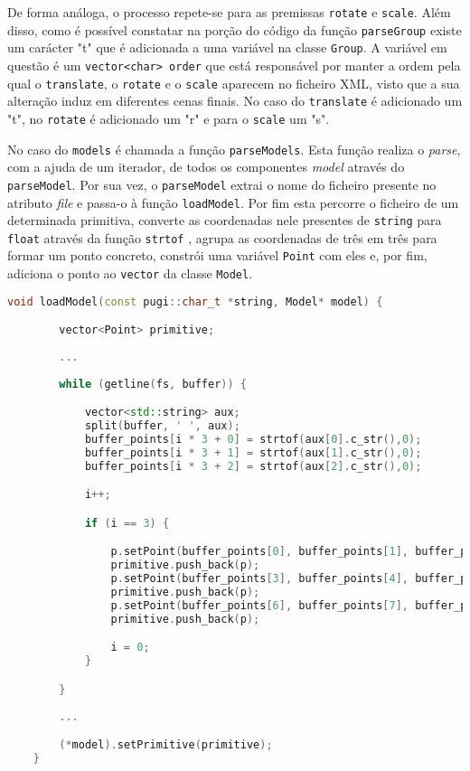 \documentclass[a4paper]{article}
\begin{document}
De forma análoga, o processo repete-se para as premissas \texttt{rotate} e \texttt{scale}. Além disso, como é possível constatar na porção do código da função \texttt{parseGroup} existe um carácter "t" que é adicionada a uma variável na classe \texttt{Group}. A variável em questão é um \texttt{vector<char> order} que está responsável por manter a ordem pela qual o \texttt{translate}, o \texttt{rotate} e o \texttt{scale} aparecem no ficheiro XML, visto que a sua alteração induz em diferentes cenas finais. No caso do \texttt{translate} é adicionado um "t", no \texttt{rotate} é adicionado um "r" e para o \texttt{scale} um "s".

No caso do \texttt{models} é chamada a função \texttt{parseModels}. Esta função realiza o \textit{parse}, com a ajuda de um iterador, de todos os componentes \textit{model} através do \texttt{parseModel}. Por sua vez, o \texttt{parseModel} extrai o nome do ficheiro presente no atributo \textit{file} e passa-o à função \texttt{loadModel}. Por fim esta percorre o ficheiro de um determinada primitiva, converte as coordenadas nele presentes de \texttt{string} para \texttt{float} através da função \texttt{strtof} \cite{strtof}, agrupa as coordenadas de três em três para formar um ponto concreto, constrói uma variável \texttt{Point} com eles e, por fim, adiciona o ponto ao \texttt{vector} da classe \texttt{Model}.

\begin{lstlisting}[language=C++, caption=\textit{Parse} do nodo \texttt{models} e consequente carregamento para a estrutura de dados.]
    void loadModel(const pugi::char_t *string, Model* model) {

        vector<Point> primitive;
        
        ...
        
        while (getline(fs, buffer)) {

            vector<std::string> aux;
            split(buffer, ' ', aux);
            buffer_points[i * 3 + 0] = strtof(aux[0].c_str(),0);
            buffer_points[i * 3 + 1] = strtof(aux[1].c_str(),0);
            buffer_points[i * 3 + 2] = strtof(aux[2].c_str(),0);

            i++;

            if (i == 3) {

                p.setPoint(buffer_points[0], buffer_points[1], buffer_points[2]);
                primitive.push_back(p);
                p.setPoint(buffer_points[3], buffer_points[4], buffer_points[5]);
                primitive.push_back(p);
                p.setPoint(buffer_points[6], buffer_points[7], buffer_points[8]);
                primitive.push_back(p);

                i = 0;
            }

        }
        
        ...

        (*model).setPrimitive(primitive);
    }
\end{lstlisting}
\end{document}
